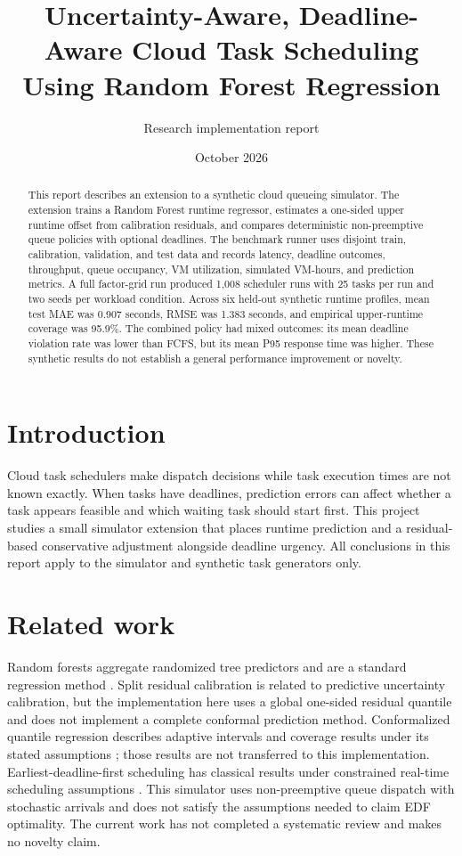 \documentclass[11pt]{article}
\title{Uncertainty-Aware, Deadline-Aware Cloud Task Scheduling Using Random Forest Regression}
\author{Research implementation report}
\date{October 2026}
\begin{document}
\maketitle

\begin{abstract}
This report describes an extension to a synthetic cloud queueing simulator. The extension trains a Random Forest runtime regressor, estimates a one-sided upper runtime offset from calibration residuals, and compares deterministic non-preemptive queue policies with optional deadlines. The benchmark runner uses disjoint train, calibration, validation, and test data and records latency, deadline outcomes, throughput, queue occupancy, VM utilization, simulated VM-hours, and prediction metrics. A full factor-grid run produced 1,008 scheduler runs with 25 tasks per run and two seeds per workload condition. Across six held-out synthetic runtime profiles, mean test MAE was 0.907 seconds, RMSE was 1.383 seconds, and empirical upper-runtime coverage was 95.9\%. The combined policy had mixed outcomes: its mean deadline violation rate was lower than FCFS, but its mean P95 response time was higher. These synthetic results do not establish a general performance improvement or novelty.
\end{abstract}

\section{Introduction}
Cloud task schedulers make dispatch decisions while task execution times are not known exactly. When tasks have deadlines, prediction errors can affect whether a task appears feasible and which waiting task should start first. This project studies a small simulator extension that places runtime prediction and a residual-based conservative adjustment alongside deadline urgency. All conclusions in this report apply to the simulator and synthetic task generators only.

\section{Related work}
Random forests aggregate randomized tree predictors and are a standard regression method \cite{breiman2001}. Split residual calibration is related to predictive uncertainty calibration, but the implementation here uses a global one-sided residual quantile and does not implement a complete conformal prediction method. Conformalized quantile regression describes adaptive intervals and coverage results under its stated assumptions \cite{romano2019}; those results are not transferred to this implementation. Earliest-deadline-first scheduling has classical results under constrained real-time scheduling assumptions \cite{liu1973}. This simulator uses non-preemptive queue dispatch with stochastic arrivals and does not satisfy the assumptions needed to claim EDF optimality. The current work has not completed a systematic review and makes no novelty claim.
\end{document}
